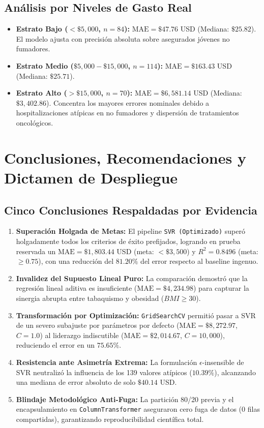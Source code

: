 \documentclass[11pt,a4paper]{article}
\begin{document}
\subsection{Análisis por Niveles de Gasto Real}
\begin{itemize}[leftmargin=*]
    \item \textbf{Estrato Bajo ($< \$5,000$, $n=84$):} $\text{MAE} = \$47.76$ USD (Mediana: $\$25.82$). El modelo ajusta con precisión absoluta sobre asegurados jóvenes no fumadores.
    \item \textbf{Estrato Medio ($\$5,000 - \$15,000$, $n=114$):} $\text{MAE} = \$163.43$ USD (Mediana: $\$25.71$).
    \item \textbf{Estrato Alto ($> \$15,000$, $n=70$):} $\text{MAE} = \$6,581.14$ USD (Mediana: $\$3,402.86$). Concentra los mayores errores nominales debido a hospitalizaciones atípicas en no fumadores y dispersión de tratamientos oncológicos.
\end{itemize}

\section{Conclusiones, Recomendaciones y Dictamen de Despliegue}

\subsection{Cinco Conclusiones Respaldadas por Evidencia}
\begin{enumerate}[leftmargin=*]
    \item \textbf{Superación Holgada de Metas:} El pipeline \texttt{SVR (Optimizado)} superó holgadamente todos los criterios de éxito prefijados, logrando en prueba reservada un $\text{MAE} = \$1,803.44$ USD (meta: $< \$3,500$) y $R^2 = 0.8496$ (meta: $\ge 0.75$), con una reducción del $81.20\%$ del error respecto al baseline ingenuo.
    \item \textbf{Invalidez del Supuesto Lineal Puro:} La comparación demostró que la regresión lineal aditiva es insuficiente ($\text{MAE} = \$4,234.98$) para capturar la sinergia abrupta entre tabaquismo y obesidad ($BMI \ge 30$).
    \item \textbf{Transformación por Optimización:} \texttt{GridSearchCV} permitió pasar a SVR de un severo subajuste por parámetros por defecto ($\text{MAE} = \$8,272.97$, $C=1.0$) al liderazgo indiscutible ($\text{MAE} = \$2,014.67$, $C=10,000$), reduciendo el error en un $75.65\%$.
    \item \textbf{Resistencia ante Asimetría Extrema:} La formulación $\epsilon$-insensible de SVR neutralizó la influencia de los 139 valores atípicos ($10.39\%$), alcanzando una mediana de error absoluto de solo $\$40.14$ USD.
    \item \textbf{Blindaje Metodológico Anti-Fuga:} La partición 80/20 previa y el encapsulamiento en \texttt{ColumnTransformer} aseguraron cero fuga de datos (0 filas compartidas), garantizando reproducibilidad científica total.
\end{enumerate}
\end{document}
